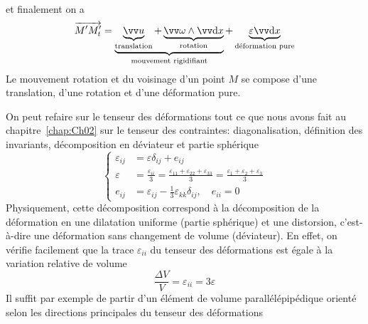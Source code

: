 et finalement on a
\begin{equation}
    \overrightarrow{M'M_t'} = \underbrace{\underbrace{\vec{u}}_{\text{translation}} + \underbrace{\vec{\omega} \wedge \vec{\ud x}}_{\text{rotation}}}_{\text{mouvement rigidifiant}} + \underbrace{\mathbb{\varepsilon} \vec{\ud x}}_{\text{déformation pure}}
     \label{eq:Ch03-037}
\end{equation}
Le mouvement rotation et du voisinage d'un point $M$ se  compose  d'une  translation, d'une rotation et d'une déformation pure.

On peut refaire sur le tenseur des déformations tout ce que nous avons fait au chapitre~\ref{chap:Ch02} sur le tenseur des contraintes: diagonalisation, définition des invariants, décomposition en déviateur et partie sphérique
\begin{equation}
    \left\{
    \begin{aligned}
        \varepsilon_{ij} &= \mathbb{\varepsilon} \delta_{ij} + e_{ij} \\
        \varepsilon & = \frac{\varepsilon_{ii}}{3} = \frac{\varepsilon_{11} + \varepsilon_{22} + \varepsilon_{33}}{3} = \frac{\varepsilon_1 + \varepsilon_2 + \varepsilon_3}{3} \\
        e_{ij} &= \varepsilon_{ij} - \frac{1}{3} \varepsilon_{kk} \delta_{ij}, \quad e_{ii} = 0
    \end{aligned}
    \right.
    \label{eq:Ch03-038}
\end{equation}
Physiquement, cette décomposition correspond à la décomposition de la déformation en une dilatation uniforme (partie sphérique) et une distorsion, c'est-à-dire une déformation sans changement de volume (déviateur).
En effet, on vérifie facilement que la trace $\varepsilon_{ii}$ du tenseur des déformations est égale à la variation relative de volume
\begin{equation}
    \frac{\Delta V}{V} = \varepsilon_{ii} = 3\varepsilon
    \label{eq:Ch03-039}
\end{equation}
Il suffit par exemple de partir d'un élément de volume parallélépipédique orienté selon les directions principales du tenseur des déformations

